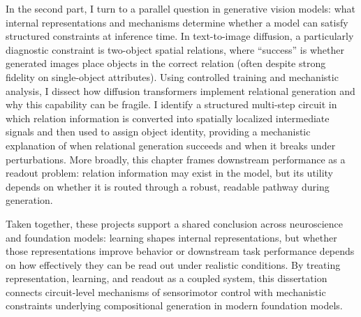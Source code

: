 In the second part, I turn to a parallel question in generative vision models: what internal representations and mechanisms determine whether a model can satisfy structured constraints at inference time. In text-to-image diffusion, a particularly diagnostic constraint is two-object spatial relations, where “success” is whether generated images place objects in the correct relation (often despite strong fidelity on single-object attributes). Using controlled training and mechanistic analysis, I dissect how diffusion transformers implement relational generation and why this capability can be fragile. I identify a structured multi-step circuit in which relation information is converted into spatially localized intermediate signals and then used to assign object identity, providing a mechanistic explanation of when relational generation succeeds and when it breaks under perturbations. More broadly, this chapter frames downstream performance as a readout problem: relation information may exist in the model, but its utility depends on whether it is routed through a robust, readable pathway during generation.


Taken together, these projects support a shared conclusion across neuroscience and foundation models: learning shapes internal representations, but whether those representations improve behavior or downstream task performance depends on how effectively they can be read out under realistic conditions. By treating representation, learning, and readout as a coupled system, this dissertation connects circuit-level mechanisms of sensorimotor control with mechanistic constraints underlying compositional generation in modern foundation models.

\afterpage{\clearpage}
